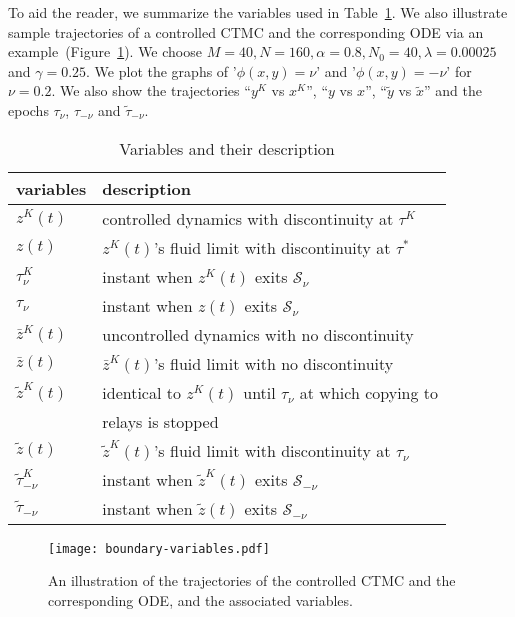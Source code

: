 \documentclass[10pt,journal,letterpaper]{IEEEtran}
\begin{document}
To aid the reader, we summarize
the variables used in Table~\ref{variables-description}.
We also illustrate sample trajectories of a controlled CTMC and the corresponding
ODE via an example~(Figure~\ref{fig:boundries}). We choose $M = 40, N = 160, \alpha = 0.8, N_0 = 40, \lambda = 0.00025$
and $\gamma = 0.25$. We plot the graphs of '$\phi(x,y) = \nu$' and '$\phi(x,y) = -\nu$'
for $\nu = 0.2$. We also show the trajectories ``$y^K$ vs $x^K$'', ``$y$ vs $x$'',  ``$\tilde{y}$ vs $\tilde{x}$''
and the epochs $\tau_{\nu}$, $\tau_{-\nu}$ and $\tilde{\tau}_{-\nu}$.


\begin{table}[t]
\renewcommand{\arraystretch}{1.3}
\caption{Variables and their description}
\label{variables-description}
\centering
\begin{tabular}{l|l}
\hline
\bfseries variables & \bfseries description \\
\hline
 $z^K(t)$ & controlled dynamics with discontinuity at $\tau^K$ \\
 $z(t)$ & $z^K(t)$'s fluid limit with discontinuity at $\tau^{\ast}$ \\
 $\tau^K_{\nu}$ & instant when $z^K(t)$ exits $\mathcal{S}_{\nu}$ \\
 $\tau_{\nu}$ & instant when $z(t)$ exits $\mathcal{S}_{\nu}$ \\
 $\bar{z}^K(t)$ & uncontrolled dynamics with no discontinuity \\
 $\bar{z}(t)$ & $\bar{z}^K(t)$'s fluid limit with no discontinuity \\
 $\tilde{z}^K(t)$ & identical to $z^K(t)$ until $\tau_{\nu}$ at which
 copying to \\
        & relays is stopped \\
 $\tilde{z}(t)$ & $\tilde{z}^K(t)$'s fluid limit with discontinuity at $\tau_{\nu}$ \\
 $\tilde{\tau}^K_{-\nu}$ & instant when $\tilde{z}^K(t)$ exits $\mathcal{S}_{-\nu}$ \\
 $\tilde{\tau}_{-\nu}$ & instant when $\tilde{z}(t)$ exits $\mathcal{S}_{-\nu}$ \\
\hline
\end{tabular}
\end{table}


\begin{figure}[b]
\centering
\texttt{[image: boundary-variables.pdf]}
\caption{An illustration of the trajectories of the controlled CTMC and the corresponding ODE, and the associated variables.}
\label{fig:boundries}
\end{figure}
\end{document}
